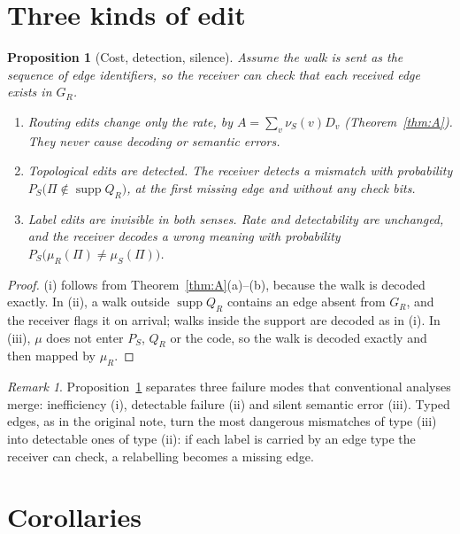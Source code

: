 \documentclass[11pt]{article}
\newtheorem{proposition}{Proposition}
\theoremstyle{definition}
\theoremstyle{remark}
\newtheorem{remark}{Remark}
\newcommand{\supp}{\operatorname{supp}}
\begin{document}
\section{Three kinds of edit}

\begin{proposition}[Cost, detection, silence]\label{prop:taxonomy}
Assume the walk is sent as the sequence of edge identifiers, so the receiver can check that each received edge exists in $G_R$.
\begin{enumerate}
\item[(i)] \emph{Routing edits} change only the rate, by $A=\sum_v\nu_S(v)D_v$ (Theorem~\ref{thm:A}). They never cause decoding or semantic errors.
\item[(ii)] \emph{Topological edits} are detected. The receiver detects a mismatch with probability $P_S\bigl(\Pi\notin\supp Q_R\bigr)$, at the first missing edge and without any check bits.
\item[(iii)] \emph{Label edits} are invisible in both senses. Rate and detectability are unchanged, and the receiver decodes a wrong meaning with probability $P_S\bigl(\mu_R(\Pi)\neq\mu_S(\Pi)\bigr)$.
\end{enumerate}
\end{proposition}

\begin{proof}
(i) follows from Theorem~\ref{thm:A}(a)--(b), because the walk is decoded exactly. In (ii), a walk outside $\supp Q_R$ contains an edge absent from $G_R$, and the receiver flags it on arrival; walks inside the support are decoded as in (i). In (iii), $\mu$ does not enter $P_S$, $Q_R$ or the code, so the walk is decoded exactly and then mapped by $\mu_R$.
\end{proof}

\begin{remark}
Proposition~\ref{prop:taxonomy} separates three failure modes that conventional analyses merge: inefficiency (i), detectable failure (ii) and silent semantic error (iii). Typed edges, as in the original note, turn the most dangerous mismatches of type (iii) into detectable ones of type (ii): if each label is carried by an edge type the receiver can check, a relabelling becomes a missing edge.
\end{remark}

\section{Corollaries}
\end{document}
